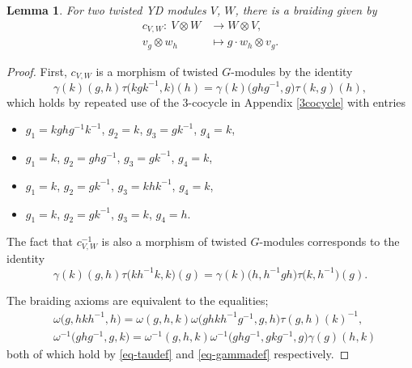\documentclass[10pt,a4paper]{amsart}
\numberwithin{equation}{section}
\newtheorem{Lemma}[Theorem]{Lemma}
\begin{document}
\begin{Lemma}
 For two twisted YD modules $V$, $W$, there is a braiding given by
 \begin{align*}
 c_{V,W}\colon\ V \otimes W &\to W \otimes V, \\
 v_g \otimes w_h &\mapsto g \cdot w_h \otimes v_g.
 \end{align*}
\end{Lemma}
\begin{proof}
First, $c_{V,W}$ is a morphism of twisted $G$-modules by the identity
\begin{equation}
\gamma(k)(g,h)\tau\big(kgk^{-1},k\big)(h)=\gamma(k)\big(ghg^{-1},g\big)\tau(k,g)(h),\label{eq:gamma-braid}
\end{equation}
which holds by repeated use of the $3$-cocycle in Appendix \ref{3cocycle} with entries
\begin{itemize}\itemsep=0pt
 \item [--] $g_1=kghg^{-1}k^{-1}$, $g_2=k$, $g_3=gk^{-1}$, $g_4=k$,
 \item [--] $g_1=k$, $g_2=ghg^{-1}$, $g_3=gk^{-1}$, $g_4=k$,
 \item [--] $g_1=k$, $g_2=gk^{-1}$, $g_3=khk^{-1}$, $g_4=k$,
 \item [--] $g_1=k$, $g_2=gk^{-1}$, $g_3=k$, $g_4=h$.
\end{itemize}
The fact that $c_{V,W}^{-1}$ is also a morphism of twisted $G$-modules corresponds to the identity
\begin{equation}\label{eq:gamma-braid2}
 \gamma(k)(g,h)\tau\big(kh^{-1}k,k\big)(g)=\gamma(k)\big(h,h^{-1}gh\big)\tau\big(k,h^{-1}\big)(g).
\end{equation}

The braiding axioms are equivalent to the equalities;
\begin{align*}
 &\omega\big(g,hkh^{-1},h\big) = \omega(g,h,k)\omega\big(ghkh^{-1}g^{-1},g,h\big) \tau(g,h)(k)^{-1}, \\
 &\omega^{-1} \big(ghg^{-1}, g,k\big) = \omega^{-1}(g,h,k)\omega^{-1}\big(ghg^{-1},gkg^{-1},g\big) \gamma(g)(h,k)
\end{align*}
 both of which hold by \eqref{eq-taudef} and \eqref{eq-gammadef} respectively.
\end{proof}
\end{document}
